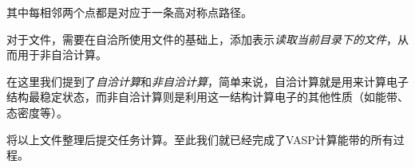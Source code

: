 其中每相邻两个点都是对应于一条高对称点路径。

对于文件，需要在自洽所使用文件的基础上，添加表示\emph{读取当前目录下的文件}，从而用于非自洽计算。

\begin{extend}
    在这里我们提到了\emph{自洽计算}和\emph{非自洽计算}，简单来说，自洽计算就是用来计算电子结构最稳定状态，而非自洽计算则是利用这一结构计算电子的其他性质（如能带、态密度等）。
\end{extend}

将以上文件整理后提交任务计算。至此我们就已经完成了VASP计算能带的所有过程。





